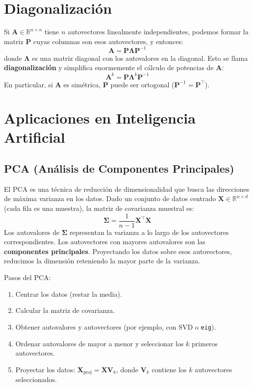 \documentclass[12pt,a4paper,openany,oneside]{book}
\begin{document}
\section{Diagonalización}

Si $\mathbf{A} \in \mathbb{R}^{n \times n}$ tiene $n$ autovectores linealmente independientes, podemos formar la matriz $\mathbf{P}$ cuyas columnas son esos autovectores, y entonces:
\[
\mathbf{A} = \mathbf{P} \mathbf{\Lambda} \mathbf{P}^{-1}
\]
donde $\mathbf{\Lambda}$ es una matriz diagonal con los autovalores en la diagonal. Esto se llama \textbf{diagonalización} y simplifica enormemente el cálculo de potencias de $\mathbf{A}$:
\[
\mathbf{A}^k = \mathbf{P} \mathbf{\Lambda}^k \mathbf{P}^{-1}
\]
En particular, si $\mathbf{A}$ es simétrica, $\mathbf{P}$ puede ser ortogonal ($\mathbf{P}^{-1} = \mathbf{P}^\top$).

\section{Aplicaciones en Inteligencia Artificial}

\subsection{PCA (Análisis de Componentes Principales)}
El PCA es una técnica de reducción de dimensionalidad que busca las direcciones de máxima varianza en los datos. Dado un conjunto de datos centrado $\mathbf{X} \in \mathbb{R}^{n \times d}$ (cada fila es una muestra), la matriz de covarianza muestral es:
\[
\boldsymbol{\Sigma} = \frac{1}{n-1} \mathbf{X}^\top \mathbf{X}
\]
Los autovalores de $\boldsymbol{\Sigma}$ representan la varianza a lo largo de los autovectores correspondientes. Los autovectores con mayores autovalores son las \textbf{componentes principales}. Proyectando los datos sobre esos autovectores, reducimos la dimensión reteniendo la mayor parte de la varianza.

Pasos del PCA:
\begin{enumerate}
    \item Centrar los datos (restar la media).
    \item Calcular la matriz de covarianza.
    \item Obtener autovalores y autovectores (por ejemplo, con SVD o \texttt{eig}).
    \item Ordenar autovalores de mayor a menor y seleccionar los $k$ primeros autovectores.
    \item Proyectar los datos: $\mathbf{X}_{\text{proj}} = \mathbf{X} \mathbf{V}_k$, donde $\mathbf{V}_k$ contiene los $k$ autovectores seleccionados.
\end{enumerate}
\end{document}
